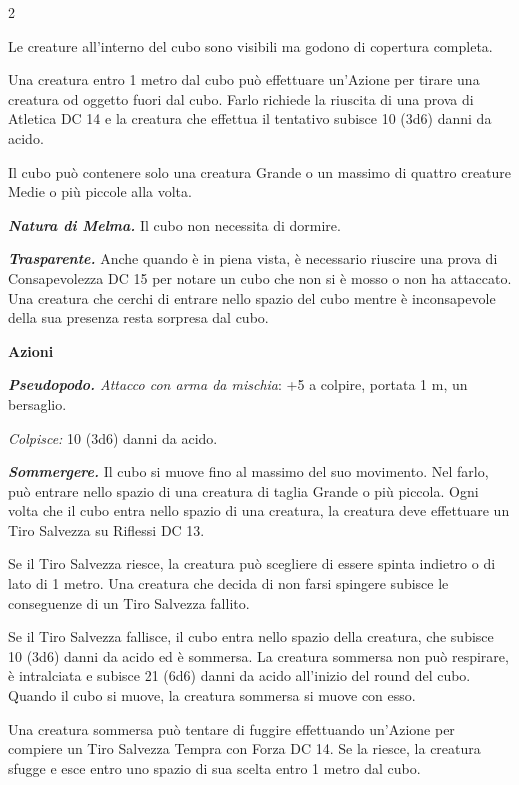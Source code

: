 \begin{multicols}{2}
{Le creature all'interno del cubo sono visibili ma godono di copertura completa.

Una creatura entro 1 metro dal cubo può effettuare un'Azione per tirare una creatura od oggetto fuori dal cubo. Farlo richiede la riuscita di una prova di Atletica DC 14 e la creatura che effettua il tentativo subisce 10 (3d6) danni da acido.

Il cubo può contenere solo una creatura Grande o un massimo di quattro creature Medie o più piccole alla volta.

\emph{\textbf{Natura di Melma.}} Il cubo non necessita di dormire.

\emph{\textbf{Trasparente.}} Anche quando è in piena vista, è necessario riuscire una prova di Consapevolezza DC 15 per notare un cubo che non si è mosso o non ha attaccato. Una creatura che cerchi di entrare nello spazio del cubo mentre è inconsapevole della sua presenza resta sorpresa dal cubo.

\textbf{Azioni}

\emph{\textbf{Pseudopodo.} Attacco con arma da mischia}: +5 a colpire, portata 1 m, un bersaglio.

\emph{Colpisce:} 10 (3d6) danni da acido.

\emph{\textbf{Sommergere.}} Il cubo si muove fino al massimo del suo movimento. Nel farlo, può entrare nello spazio di una creatura di taglia Grande o più piccola. Ogni volta che il cubo entra nello spazio di una creatura, la creatura deve effettuare un Tiro Salvezza su Riflessi DC 13.

Se il Tiro Salvezza riesce, la creatura può scegliere di essere spinta indietro o di lato di 1 metro. Una creatura che decida di non farsi spingere subisce le conseguenze di un Tiro Salvezza fallito.

Se il Tiro Salvezza fallisce, il cubo entra nello spazio della creatura, che subisce 10 (3d6) danni da acido ed è sommersa. La creatura sommersa non può respirare, è intralciata e subisce 21 (6d6) danni da acido all'inizio del round del cubo. Quando il cubo si muove, la creatura sommersa si muove con esso.

Una creatura sommersa può tentare di fuggire effettuando un'Azione per compiere un Tiro Salvezza Tempra con Forza DC 14. Se la riesce, la creatura sfugge e esce entro uno spazio di sua scelta entro 1 metro dal cubo.

}
\end{multicols}
